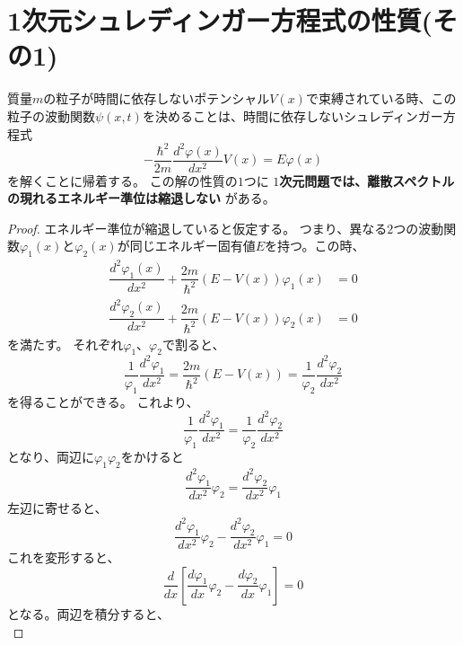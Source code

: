 

\section{1次元シュレディンガー方程式の性質(その1)} \label{1dim_schrodinger_eq_propeties}
質量$m$の粒子が時間に依存しないポテンシャル$V(x)$で束縛されている時、この粒子の波動関数$\psi(x,t)$を決めることは、時間に依存しないシュレディンガー方程式
\begin{equation}
	- \dfrac{\hbar^2}{2m} \dfrac{d^2 \varphi(x)}{d x^2} V(x)= E\varphi(x)
\end{equation}
を解くことに帰着する。
この解の性質の$1$つに
{\bf $1$次元問題では、離散スペクトルの現れるエネルギー準位は縮退しない}
がある。

\begin{proof}
	エネルギー準位が縮退していると仮定する。
	つまり、異なる$2$つの波動関数$\varphi_1(x)$と$\varphi_2(x)$が同じエネルギー固有値$E$を持つ。この時、
	\begin{align}
		\dfrac{d^2 \varphi_1(x)}{dx^2} + \dfrac{2m}{\hbar^2}(E-V(x))\varphi_1(x) &= 0 \\
		\dfrac{d^2 \varphi_2(x)}{dx^2} + \dfrac{2m}{\hbar^2}(E-V(x))\varphi_2(x) &= 0
	\end{align}
	を満たす。
	それぞれ$\varphi_1$、$\varphi_2$で割ると、
	\begin{equation}
		\dfrac{1}{\varphi_1}\dfrac{d^2 \varphi_1}{dx^2} = \dfrac{2m}{\hbar^2}(E-V(x)) = \dfrac{1}{\varphi_2}\dfrac{d^2 \varphi_2}{dx^2}
	\end{equation}
	を得ることができる。
	これより、
	\begin{equation}
		\dfrac{1}{\varphi_1}\dfrac{d^2 \varphi_1}{dx^2} = \dfrac{1}{\varphi_2}\dfrac{d^2 \varphi_2}{dx^2}
	\end{equation}
	となり、両辺に$\varphi_1 \varphi_2$をかけると
	\begin{equation}
		\dfrac{d^2 \varphi_1}{dx^2}\varphi_2 = \dfrac{d^2 \varphi_2}{dx^2}\varphi_1
	\end{equation}
	左辺に寄せると、
	\begin{equation}
		\dfrac{d^2 \varphi_1}{dx^2}\varphi_2 - \dfrac{d^2 \varphi_2}{dx^2}\varphi_1 = 0
	\end{equation}
	これを変形すると、
	\begin{equation}
		\dfrac{d}{dx}\left[ \dfrac{d\varphi_1}{dx}\varphi_2 - \dfrac{d\varphi_2}{dx}\varphi_1\right] = 0
	\end{equation}
	となる。両辺を積分すると、
	\begin{equation}

\end{equation}
\end{proof}
